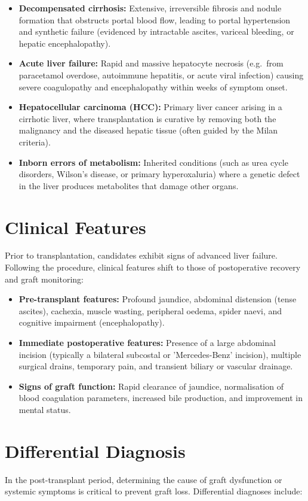 \begin{itemize}
    \item \textbf{Decompensated cirrhosis:} Extensive, irreversible fibrosis and nodule formation that obstructs portal blood flow, leading to portal hypertension and synthetic failure (evidenced by intractable ascites, variceal bleeding, or hepatic encephalopathy).
    \item \textbf{Acute liver failure:} Rapid and massive hepatocyte necrosis (e.g.\ from paracetamol overdose, autoimmune hepatitis, or acute viral infection) causing severe coagulopathy and encephalopathy within weeks of symptom onset.
    \item \textbf{Hepatocellular carcinoma (HCC):} Primary liver cancer arising in a cirrhotic liver, where transplantation is curative by removing both the malignancy and the diseased hepatic tissue (often guided by the Milan criteria).
    \item \textbf{Inborn errors of metabolism:} Inherited conditions (such as urea cycle disorders, Wilson's disease, or primary hyperoxaluria) where a genetic defect in the liver produces metabolites that damage other organs.
\end{itemize}

\section*{Clinical Features}
Prior to transplantation, candidates exhibit signs of advanced liver failure. Following the procedure, clinical features shift to those of postoperative recovery and graft monitoring:

\begin{itemize}
    \item \textbf{Pre-transplant features:} Profound jaundice, abdominal distension (tense ascites), cachexia, muscle wasting, peripheral oedema, spider naevi, and cognitive impairment (encephalopathy).
    \item \textbf{Immediate postoperative features:} Presence of a large abdominal incision (typically a bilateral subcostal or 'Mercedes-Benz' incision), multiple surgical drains, temporary pain, and transient biliary or vascular drainage.
    \item \textbf{Signs of graft function:} Rapid clearance of jaundice, normalisation of blood coagulation parameters, increased bile production, and improvement in mental status.
\end{itemize}

\section*{Differential Diagnosis}
In the post-transplant period, determining the cause of graft dysfunction or systemic symptoms is critical to prevent graft loss. Differential diagnoses include:

